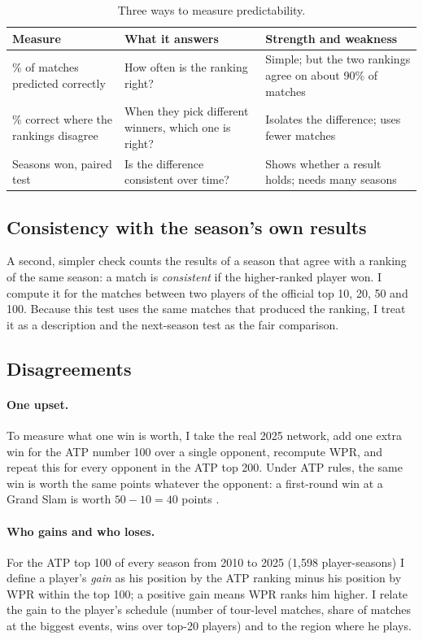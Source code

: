 \documentclass[11pt]{article}
\begin{document}
\begin{table}[!htbp]
\centering
\small
\caption{Three ways to measure predictability.}
\label{tab:measures}
\begin{tabularx}{\textwidth}{@{}>{\raggedright\arraybackslash}p{3.6cm}LL@{}}
\toprule
Measure & What it answers & Strength and weakness \\
\midrule
\% of matches predicted correctly & How often is the ranking right? & Simple; but the two rankings agree on about 90\% of matches \\
\% correct where the rankings disagree & When they pick different winners, which one is right? & Isolates the difference; uses fewer matches \\
Seasons won, paired test & Is the difference consistent over time? & Shows whether a result holds; needs many seasons \\
\bottomrule
\end{tabularx}
\end{table}

\subsection{Consistency with the season's own results}
A second, simpler check counts the results of a season that agree with a ranking of the same season: a match is \emph{consistent} if the higher-ranked player won. I compute it for the matches between two players of the official top 10, 20, 50 and 100. Because this test uses the same matches that produced the ranking, I treat it as a description and the next-season test as the fair comparison.

\subsection{Disagreements}
\paragraph{One upset.} To measure what one win is worth, I take the real 2025 network, add one extra win for the ATP number 100 over a single opponent, recompute WPR, and repeat this for every opponent in the ATP top 200. Under ATP rules, the same win is worth the same points whatever the opponent: a first-round win at a Grand Slam is worth $50-10=40$ points \citep{atppoints2024}.

\paragraph{Who gains and who loses.} For the ATP top 100 of every season from 2010 to 2025 (1{,}598 player-seasons) I define a player's \emph{gain} as his position by the ATP ranking minus his position by WPR within the top 100; a positive gain means WPR ranks him higher. I relate the gain to the player's schedule (number of tour-level matches, share of matches at the biggest events, wins over top-20 players) and to the region where he plays.
\end{document}
